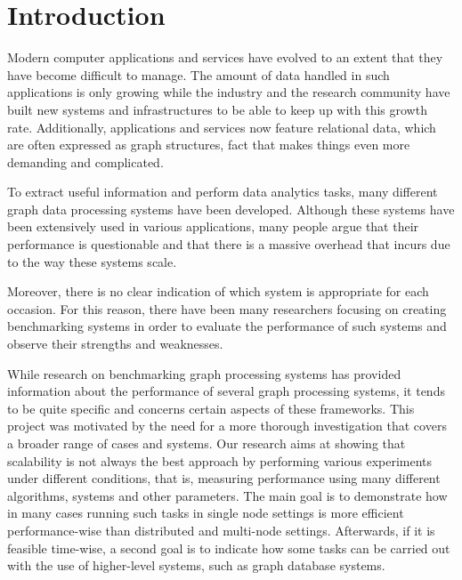 \documentclass[a4paper,11pt]{article}
\begin{document}

\section{Introduction} \label{introduction}


\par Modern computer applications and services have evolved to an extent that they have become difficult to manage. The amount of data handled in such applications is only growing while the industry and the research community have built new systems and infrastructures to be able to keep up with this growth rate. Additionally, applications and services now feature relational data, which are often expressed as graph structures, fact that makes things even more demanding and complicated.

\medskip

\par To extract useful information and perform data analytics tasks, many different graph data processing systems have been developed. Although these systems have been extensively used in various applications, many people argue that their performance is questionable and that there is a massive overhead that incurs due to the way these systems scale.

\medskip

\par Moreover, there is no clear indication of which system is appropriate for each occasion. For this reason, there have been many researchers focusing on creating benchmarking systems in order to evaluate the performance of such systems and observe their strengths and weaknesses.

\medskip

\par While research on benchmarking graph processing systems has provided information about the performance of several graph processing systems, it tends to be quite specific and concerns certain aspects of these frameworks. This project was motivated by the need for a more thorough investigation that covers a broader range of cases and systems. Our research aims at showing that scalability is not always the best approach by performing various experiments under different conditions, that is, measuring performance using many different algorithms, systems and other parameters. The main goal is to demonstrate how in many cases running such tasks in single node settings is more efficient performance-wise than distributed and multi-node settings. Afterwards, if it is feasible time-wise, a second goal is to indicate how some tasks can be carried out with the use of higher-level systems, such as graph database systems.
\end{document}

